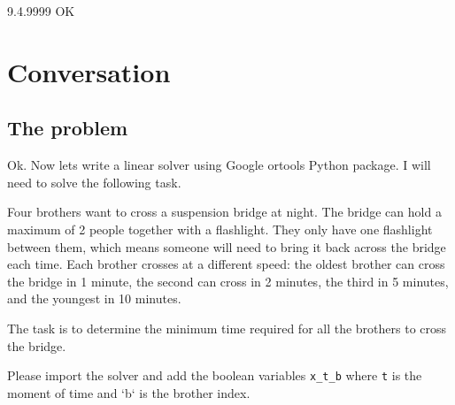 \begin{result}
9.4.9999
OK
\end{result}

\section{Conversation}

\subsection{The problem}

\begin{ai}
Ok. Now lets write a linear solver using Google ortools Python package. I will
need to solve the following task.

\vsp
Four brothers want to cross a suspension bridge at night. The bridge can hold a
maximum of 2 people together with a flashlight. They only have one flashlight
between them, which means someone will need to bring it back across the bridge
each time. Each brother crosses at a different speed: the oldest brother can
cross the bridge in 1 minute, the second can cross in 2 minutes, the third in 5
minutes, and the youngest in 10 minutes.

The task is to determine the minimum time required for all the brothers to cross
the bridge.

\vsp
Please import the solver and add the boolean variables \verb|x_t_b| where
\verb|t| is the moment of time and `b` is the brother index.
\end{ai}

